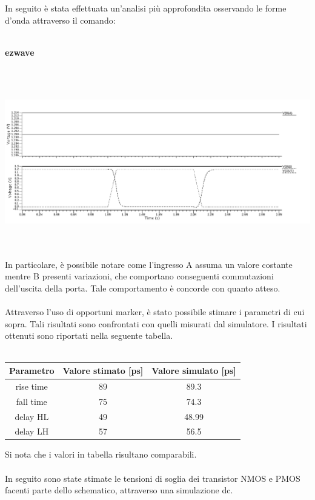 \documentclass[11pt,  english, makeidx, a4paper, titlepage, oneside]{book}
\begin{document}
\\\\
In seguito è stata effettuata un'analisi più approfondita osservando le forme d'onda attraverso il comando:
\\\\
\centerline{\textbf{ezwave}}
\\\\
\centerline{\includegraphics[width=14cm]{./img/Lab_5/waveform_1.png}}
\\\\
In particolare, è possibile notare come l'ingresso A assuma un valore costante mentre B presenti variazioni, che comportano conseguenti commutazioni dell'uscita della porta. Tale comportamento è concorde con quanto atteso.
\\\\
Attraverso l'uso di opportuni marker, è stato possibile stimare i parametri di cui sopra. Tali risultati sono confrontati con quelli misurati dal simulatore. I risultati ottenuti sono riportati nella seguente tabella.
\\\\
\begin{center}
	\begin{tabular}{|c|c|c|}
	\hline
	Parametro & Valore stimato [ps] & Valore simulato [ps] \\
	\hline
	 rise time & 89 &  89.3 \\
	\hline
	 fall time & 75 & 74.3 \\
	\hline
	delay HL & 49 &  48.99 \\
	\hline
	delay LH & 57  &  56.5 \\
	\hline
	\end{tabular}	
\end{center}
\vspace{0.3cm}
Si nota che i valori in tabella risultano comparabili.
\\\\
In seguito sono state stimate le tensioni di soglia dei transistor NMOS e PMOS facenti parte dello schematico, attraverso una simulazione dc.
\end{document}
